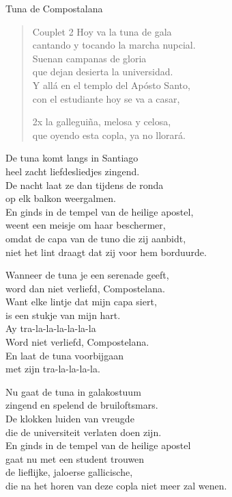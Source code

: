 \begin{song}{Tuna de Compostalana}
\begin{verse}{Couplet 2}
\hspace{4em}Hoy va la tuna de gala\\
cantando y tocando la marcha nupcial.\\
\hspace{4em}Suenan campanas de gloria\\
que dejan desierta la universidad.\\
Y allá en el templo del Apósto Santo,\\
con el estudiante hoy se va a casar,\\
\begin{sidenote}{2x}
la galleguiña, melosa y celosa,\\
que oyendo esta copla, ya no llorará. 
\end{sidenote}
\end{verse}
\normalsize
\end{song}

\clearpage
\begin{translation}
De tuna komt langs in Santiago\\
heel zacht liefdesliedjes zingend.\\
De nacht laat ze dan tijdens de ronda\\
op elk balkon weergalmen.\\
En ginds in de tempel van de heilige apostel,\\
weent een meisje om haar beschermer,\\
omdat de capa van de tuno die zij aanbidt,\\
niet het lint draagt dat zij voor hem borduurde.\vspace{\wlskip}

Wanneer de tuna je een serenade geeft,\\
word dan niet verliefd, Compostelana.\\
Want elke lintje dat mijn capa siert,\\
is een stukje van mijn hart.\\
Ay tra-la-la-la-la-la-la\\
Word niet verliefd, Compostelana.\\
En laat de tuna voorbijgaan\\
met zijn tra-la-la-la-la.\vspace{\wlskip}

Nu gaat de tuna in galakostuum\\
zingend en spelend de bruiloftsmars.\\
De klokken luiden van vreugde\\
die de universiteit verlaten doen zijn.\\
En ginds in de tempel van de heilige apostel\\
gaat nu met een student trouwen\\
de lieflijke, jaloerse gallicische,\\
die na het horen van deze copla niet meer zal wenen.
\end{translation}
